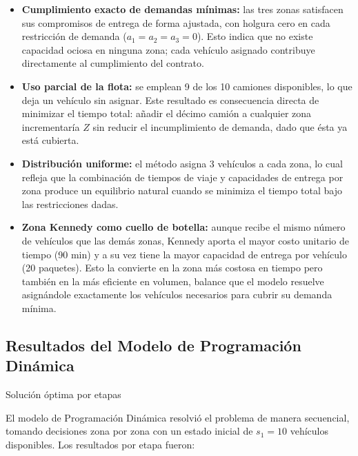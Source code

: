 \documentclass[12pt]{article}
\begin{document}
\begin{itemize}
	\item \textbf{Cumplimiento exacto de demandas mínimas:} las tres zonas satisfacen sus compromisos de entrega de forma ajustada, con holgura cero en cada restricción de demanda ($a_1 = a_2 = a_3 = 0$). Esto indica que no existe capacidad ociosa en ninguna zona; cada vehículo asignado contribuye directamente al cumplimiento del contrato.
	
	\item \textbf{Uso parcial de la flota:} se emplean 9 de los 10 camiones disponibles, lo que deja un vehículo sin asignar. Este resultado es consecuencia directa de minimizar el tiempo total: añadir el décimo camión a cualquier zona incrementaría $Z$ sin reducir el incumplimiento de demanda, dado que ésta ya está cubierta.
	
	\item \textbf{Distribución uniforme:} el método asigna 3 vehículos a cada zona, lo cual refleja que la combinación de tiempos de viaje y capacidades de entrega por zona produce un equilibrio natural cuando se minimiza el tiempo total bajo las restricciones dadas.
	
	\item \textbf{Zona Kennedy como cuello de botella:} aunque recibe el mismo número de vehículos que las demás zonas, Kennedy aporta el mayor costo unitario de tiempo (90 min) y a su vez tiene la mayor capacidad de entrega por vehículo (20 paquetes). Esto la convierte en la zona más costosa en tiempo pero también en la más eficiente en volumen, balance que el modelo resuelve asignándole exactamente los vehículos necesarios para cubrir su demanda mínima.
\end{itemize}

\subsection{Resultados del Modelo de Programación Dinámica}

\begin{accentbar}
	Solución óptima por etapas
\end{accentbar}

El modelo de Programación Dinámica resolvió el problema de manera secuencial, tomando decisiones zona por zona con un estado inicial de $s_1 = 10$ vehículos disponibles. Los resultados por etapa fueron:
\end{document}
